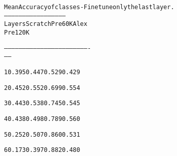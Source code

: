 \documentclass[letterpaper,10pt,english]{/usr/share/sphinx/texinputs/sphinxhowto}
\newenvironment{InvisibleVerbatim}
        {\begin{mdframed}[leftmargin=0.1\linewidth,innerleftmargin=3pt,innerrightmargin=3pt, userdefinedwidth=1\linewidth, linewidth=0pt, linecolor=white, usetwoside=false]}
        {\end{mdframed}}
\begin{document}
                \begin{InvisibleVerbatim}
                \vspace{-0.5\baselineskip}
\begin{alltt}Mean Accuracy of classes - Finetune only the last layer.
--------------------------------------------------
Layers          Scratch         Pre60K          Alex
Pre120K

----------------------------------------------------------------------
-----

1               0.395           0.447           0.529           0.429

2               0.452           0.552           0.699           0.554

3               0.443           0.538           0.745           0.545

4               0.438           0.498           0.789           0.560

5               0.252           0.507           0.860           0.531

6               0.173           0.397           0.882           0.480

\end{alltt}

            \end{InvisibleVerbatim}
            
        
    


\end{document}
